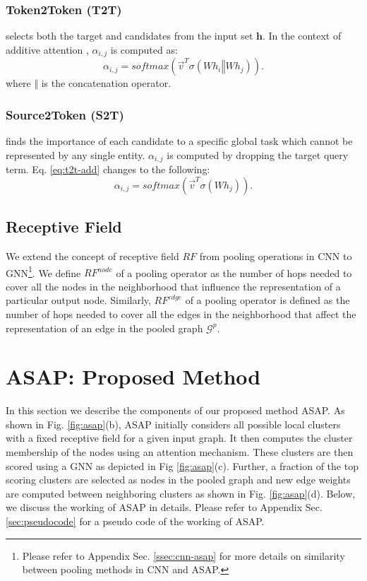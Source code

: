 \documentclass[letterpaper]{article} \usepackage{aaai20}  \usepackage{times}  \usepackage{helvet} \usepackage{courier}  \usepackage[hyphens]{url}  \usepackage{graphicx} \urlstyle{rm} \def\UrlFont{\rm}  \usepackage{graphicx}  \frenchspacing  \setlength{\pdfpagewidth}{8.5in}  \setlength{\pdfpageheight}{11in}
\begin{document}
\subsubsection{Token2Token (T2T)} selects both the target and candidates from the input set $\boldsymbol{h}$. In the context of additive attention \cite{bahdanau}, $\alpha_{i,j}$ is computed as:
\begin{equation}
\label{eq:t2t-add}
    \alpha_{i, j} = softmax(\Vec{v}^{T}\sigma(W h_{i} \mathbin\Vert W h_{j})).
\end{equation}
where $\mathbin\Vert$ is the concatenation operator.

\subsubsection{Source2Token (S2T)} finds the importance of each candidate to a specific global task which cannot be represented by any single entity. $\alpha_{i,j}$ is computed by dropping the target query term. Eq. \eqref{eq:t2t-add} changes to the following:
\begin{equation}
\label{eq:s2t-add}
    \alpha_{i,j} = softmax(\Vec{v}^{T}\sigma(W h_{j})).
\end{equation}

\subsection{Receptive Field} 



We extend the concept of receptive field $RF$ from pooling operations in CNN  to GNN\footnote{Please refer to Appendix Sec. \ref{ssec:cnn-asap} for more details on similarity between pooling methods in CNN and ASAP.}. We define $RF^{node}$ of a pooling operator as the number of hops needed to cover all the nodes in the neighborhood that influence the representation of a particular output node. Similarly, $RF^{edge}$ of a pooling operator is defined as the number of hops needed to cover all the edges in the neighborhood that affect the representation of an edge in the pooled graph $\mathcal{G}^{p}$.


%
 
\section{ASAP: Proposed Method}
\label{sec:proposed-method}


In this section we describe the components of our proposed method ASAP. As shown in Fig. \ref{fig:asap}(b), ASAP initially considers all possible local clusters with a fixed receptive field for a given input graph. It then computes the cluster membership of the nodes using an attention mechanism. These clusters are then scored using a GNN as depicted in Fig \ref{fig:asap}(c). Further, a fraction of the top scoring clusters are selected as nodes in the pooled graph and new edge weights are computed between neighboring clusters as shown in Fig. \ref{fig:asap}(d). Below, we discuss the working of ASAP in details. Please refer to Appendix Sec. \ref{sec:pseudocode} for a pseudo code of the working of ASAP.
\end{document}
